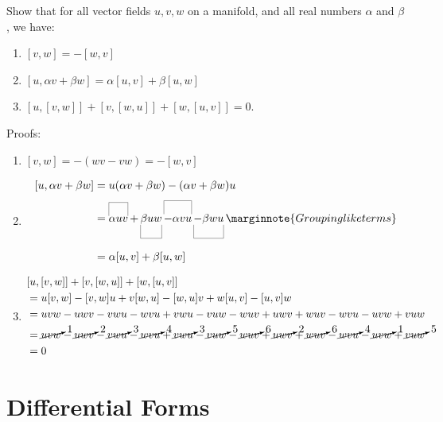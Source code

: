 \documentclass[10pt]{article}
\begin{document}
\begin{example}\label{b1e24}
	Show that for all vector fields $u,v,w$ on a manifold, and all real numbers 
	$\alpha$ and $\beta$, we have:
	\begin{enumerate}
		\item $[v,w]=-[w,v]$
		\item $[u,\alpha v+\beta w]=\alpha[u,v]+\beta[u,w]$
		\item {} $[u,[v,w]] + [v,[w,u]] + [w,[u,v]] = 0$.
	\end{enumerate}
\end{example}
\sol Proofs:
\begin{enumerate}
	\item $[v,w] = -(wv-vw) = -[w,v]$
	\item $$\begin{aligned}
		[u,\alpha v+\beta w] &= u(\alpha v+\beta w)-(\alpha v+\beta w)u\\
		&= \ob{\alpha uv}{}+\ub{\beta uw}{} \ob{- \alpha vu}{}\ub{-\beta wu}{}\marginnote{Grouping like terms}\\
		&= \alpha[u,v]+\beta[u,w]
	\end{aligned}$$
	\item $$\begin{aligned}
		&[u,[v,w]] + [v,[w,u]] + [w,[u,v]]\\
		&= u[v,w]-[v,w]u + v[w,u]-[w,u]v + w[u,v]-[u,v]w\\
		&= uvw-uwv-vwu-wvu+vwu-vuw-wuv+uwv+wuv-wvu-uvw+vuw\\
		&= \cancelto{1}{uvw}-\cancelto{2}{uwv}-\cancelto{3}{vwu}-\cancelto{4}{wvu}+\cancelto{3}{vwu}-\cancelto{5}{vuw}-\cancelto{6}{wuv}+\cancelto{2}{uwv}+\cancelto{6}{wuv}-\cancelto{4}{wvu}-\cancelto{1}{uvw}+\cancelto{5}{vuw}\\
		&= 0
	\end{aligned}$$
\end{enumerate}



\newpage
\section{Differential Forms}\label{b1c4}
\end{document}
